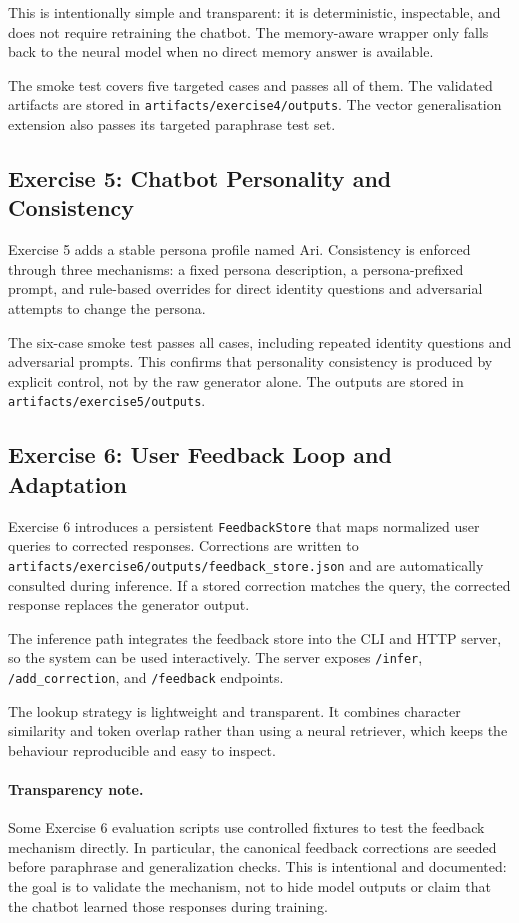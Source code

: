 \documentclass[11pt,a4paper]{article}
\begin{document}
This is intentionally simple and transparent: it is deterministic, inspectable, and does not require retraining the chatbot. The memory-aware wrapper only falls back to the neural model when no direct memory answer is available.

The smoke test covers five targeted cases and passes all of them. The validated artifacts are stored in \texttt{artifacts/exercise4/outputs}. The vector generalisation extension also passes its targeted paraphrase test set.

\subsection{Exercise 5: Chatbot Personality and Consistency}
Exercise 5 adds a stable persona profile named Ari. Consistency is enforced through three mechanisms: a fixed persona description, a persona-prefixed prompt, and rule-based overrides for direct identity questions and adversarial attempts to change the persona.

The six-case smoke test passes all cases, including repeated identity questions and adversarial prompts. This confirms that personality consistency is produced by explicit control, not by the raw generator alone. The outputs are stored in \texttt{artifacts/exercise5/outputs}.

\subsection{Exercise 6: User Feedback Loop and Adaptation}
Exercise 6 introduces a persistent \texttt{FeedbackStore} that maps normalized user queries to corrected responses. Corrections are written to \texttt{artifacts/exercise6/outputs/feedback\_store.json} and are automatically consulted during inference. If a stored correction matches the query, the corrected response replaces the generator output.

The inference path integrates the feedback store into the CLI and HTTP server, so the system can be used interactively. The server exposes \texttt{/infer}, \texttt{/add\_correction}, and \texttt{/feedback} endpoints.

The lookup strategy is lightweight and transparent. It combines character similarity and token overlap rather than using a neural retriever, which keeps the behaviour reproducible and easy to inspect.

\paragraph{Transparency note.}
Some Exercise 6 evaluation scripts use controlled fixtures to test the feedback mechanism directly. In particular, the canonical feedback corrections are seeded before paraphrase and generalization checks. This is intentional and documented: the goal is to validate the mechanism, not to hide model outputs or claim that the chatbot learned those responses during training.
\end{document}
